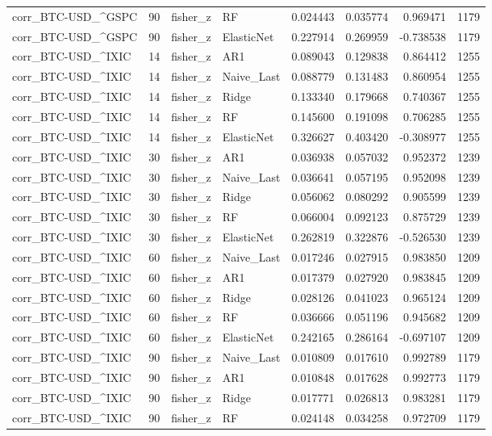 \begin{table}
\begin{tabular}{lrllrrrr}
corr_BTC-USD_^GSPC & 90 & fisher_z & RF & 0.024443 & 0.035774 & 0.969471 & 1179 \\
corr_BTC-USD_^GSPC & 90 & fisher_z & ElasticNet & 0.227914 & 0.269959 & -0.738538 & 1179 \\
corr_BTC-USD_^IXIC & 14 & fisher_z & AR1 & 0.089043 & 0.129838 & 0.864412 & 1255 \\
corr_BTC-USD_^IXIC & 14 & fisher_z & Naive_Last & 0.088779 & 0.131483 & 0.860954 & 1255 \\
corr_BTC-USD_^IXIC & 14 & fisher_z & Ridge & 0.133340 & 0.179668 & 0.740367 & 1255 \\
corr_BTC-USD_^IXIC & 14 & fisher_z & RF & 0.145600 & 0.191098 & 0.706285 & 1255 \\
corr_BTC-USD_^IXIC & 14 & fisher_z & ElasticNet & 0.326627 & 0.403420 & -0.308977 & 1255 \\
corr_BTC-USD_^IXIC & 30 & fisher_z & AR1 & 0.036938 & 0.057032 & 0.952372 & 1239 \\
corr_BTC-USD_^IXIC & 30 & fisher_z & Naive_Last & 0.036641 & 0.057195 & 0.952098 & 1239 \\
corr_BTC-USD_^IXIC & 30 & fisher_z & Ridge & 0.056062 & 0.080292 & 0.905599 & 1239 \\
corr_BTC-USD_^IXIC & 30 & fisher_z & RF & 0.066004 & 0.092123 & 0.875729 & 1239 \\
corr_BTC-USD_^IXIC & 30 & fisher_z & ElasticNet & 0.262819 & 0.322876 & -0.526530 & 1239 \\
corr_BTC-USD_^IXIC & 60 & fisher_z & Naive_Last & 0.017246 & 0.027915 & 0.983850 & 1209 \\
corr_BTC-USD_^IXIC & 60 & fisher_z & AR1 & 0.017379 & 0.027920 & 0.983845 & 1209 \\
corr_BTC-USD_^IXIC & 60 & fisher_z & Ridge & 0.028126 & 0.041023 & 0.965124 & 1209 \\
corr_BTC-USD_^IXIC & 60 & fisher_z & RF & 0.036666 & 0.051196 & 0.945682 & 1209 \\
corr_BTC-USD_^IXIC & 60 & fisher_z & ElasticNet & 0.242165 & 0.286164 & -0.697107 & 1209 \\
corr_BTC-USD_^IXIC & 90 & fisher_z & Naive_Last & 0.010809 & 0.017610 & 0.992789 & 1179 \\
corr_BTC-USD_^IXIC & 90 & fisher_z & AR1 & 0.010848 & 0.017628 & 0.992773 & 1179 \\
corr_BTC-USD_^IXIC & 90 & fisher_z & Ridge & 0.017771 & 0.026813 & 0.983281 & 1179 \\
corr_BTC-USD_^IXIC & 90 & fisher_z & RF & 0.024148 & 0.034258 & 0.972709 & 1179 \\

\end{tabular}
\end{table}

